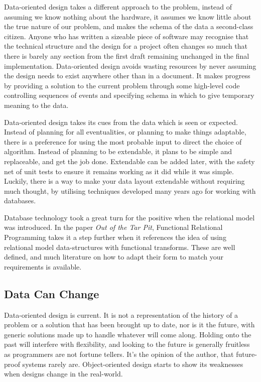 \documentclass[a4paper,12pt]{article}
\begin{document}
Data-oriented design takes a different approach to the problem, instead of assuming we know nothing about the hardware, it assumes we know little about the true nature of our problem, and makes the schema of the data a second-class citizen.
Anyone who has written a sizeable piece of software may recognise that the technical structure and the design for a project often changes so much that there is barely any section from the first draft remaining unchanged in the final implementation.
Data-oriented design avoids wasting resources by never assuming the design needs to exist anywhere other than in a document.
It makes progress by providing a solution to the current problem through some high-level code controlling sequences of events and specifying schema in which to give temporary meaning to the data.

Data-oriented design takes its cues from the data which is seen or expected.
Instead of planning for all eventualities, or planning to make things adaptable, there is a preference for using the most probable input to direct the choice of algorithm.
Instead of planning to be extendable, it plans to be simple and replaceable, and get the job done.
Extendable can be added later, with the safety net of unit tests to ensure it remains working as it did while it was simple.
Luckily, there is a way to make your data layout extendable without requiring much thought, by utilising techniques developed many years ago for working with databases.

Database technology took a great turn for the positive when the relational model was introduced.
In the paper \textit{Out of the Tar Pit}, Functional Relational Programming takes it a step further when it references the idea of using relational model data-structures with functional transforms.
These are well defined, and much literature on how to adapt their form to match your requirements is available.

\subsection{Data Can Change}

Data-oriented design is current.
It is not a representation of the history of a problem or a solution that has been brought up to date, nor is it the future, with generic solutions made up to handle whatever will come along.
Holding onto the past will interfere with flexibility, and looking to the future is generally fruitless as programmers are not fortune tellers.
It's the opinion of the author, that future-proof systems rarely are.
Object-oriented design starts to show its weaknesses when designs change in the real-world.
\end{document}
